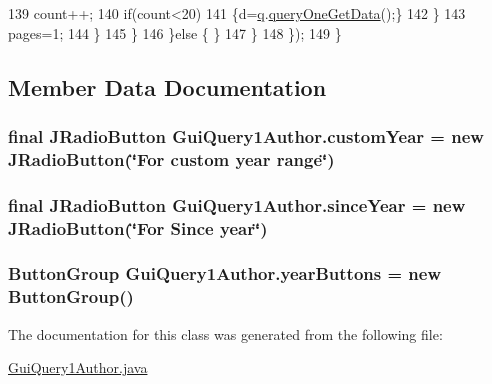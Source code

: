 \begin{DoxyCode}
139                                     count++;
140                                     \textcolor{keywordflow}{if}(count<20)
141                                     \{d=\hyperlink{classGUIQuery_a2a20445d749185552014142b78f3e071}{q}.\hyperlink{classQueryFacade_adf9324b3f38765b2b6c1b4a64b301a11}{queryOneGetData}();\}    
142                                 \}
143                                 pages=1;
144                             \}   
145                         \}
146                     \}\textcolor{keywordflow}{else} \{ \}   
147                 \}
148         \});
149     \}   
\end{DoxyCode}


\subsection{Member Data Documentation}
\subsubsection[{\texorpdfstring{custom\+Year}{customYear}}]{\setlength{\rightskip}{0pt plus 5cm}final J\+Radio\+Button Gui\+Query1\+Author.\+custom\+Year = new J\+Radio\+Button(\char`\"{}For custom year range\char`\"{})\hspace{0.3cm}{\ttfamily [private]}}\hypertarget{classGuiQuery1Author_a0ace1bd452a0f78fdda026280b168781}{}\label{classGuiQuery1Author_a0ace1bd452a0f78fdda026280b168781}
\subsubsection[{\texorpdfstring{since\+Year}{sinceYear}}]{\setlength{\rightskip}{0pt plus 5cm}final J\+Radio\+Button Gui\+Query1\+Author.\+since\+Year = new J\+Radio\+Button(\char`\"{}For Since year\char`\"{})\hspace{0.3cm}{\ttfamily [private]}}\hypertarget{classGuiQuery1Author_a5f63c8ecd9f332aadcbb7ec4c68dae30}{}\label{classGuiQuery1Author_a5f63c8ecd9f332aadcbb7ec4c68dae30}
\subsubsection[{\texorpdfstring{year\+Buttons}{yearButtons}}]{\setlength{\rightskip}{0pt plus 5cm}Button\+Group Gui\+Query1\+Author.\+year\+Buttons = new Button\+Group()\hspace{0.3cm}{\ttfamily [private]}}\hypertarget{classGuiQuery1Author_a67b9d26988f566d493d8599a909d71e6}{}\label{classGuiQuery1Author_a67b9d26988f566d493d8599a909d71e6}


The documentation for this class was generated from the following file\+:\begin{DoxyCompactItemize}
\item 
\hyperlink{GuiQuery1Author_8java}{Gui\+Query1\+Author.\+java}\end{DoxyCompactItemize}
